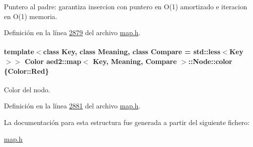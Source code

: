 Puntero al padre\+: garantiza insercion con puntero en O(1) amortizado e iteracion en O(1) memoria. 



Definición en la línea \hyperlink{map_8h_source_l02879}{2879} del archivo \hyperlink{map_8h_source}{map.\+h}.

\paragraph[{\texorpdfstring{color}{color}}]{\setlength{\rightskip}{0pt plus 5cm}template$<$class Key, class Meaning, class Compare = std\+::less$<$\+Key$>$$>$ {\bf Color} {\bf aed2\+::map}$<$ Key, Meaning, Compare $>$\+::Node\+::color \{Color\+::\+Red\}}\hypertarget{structaed2_1_1map_1_1Node_a58dd9993fee8ee3eaa5716b72a3eca47_a58dd9993fee8ee3eaa5716b72a3eca47}{}\label{structaed2_1_1map_1_1Node_a58dd9993fee8ee3eaa5716b72a3eca47_a58dd9993fee8ee3eaa5716b72a3eca47}


Color del nodo. 



Definición en la línea \hyperlink{map_8h_source_l02881}{2881} del archivo \hyperlink{map_8h_source}{map.\+h}.



La documentación para esta estructura fue generada a partir del siguiente fichero\+:\begin{DoxyCompactItemize}
\item 
\hyperlink{map_8h}{map.\+h}\end{DoxyCompactItemize}
